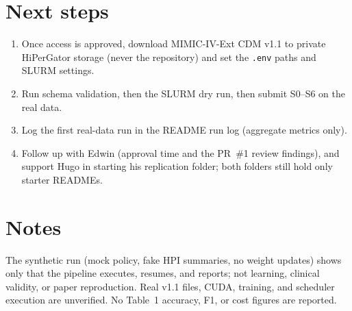 \documentclass[11pt,letterpaper]{article}
\begin{document}
\section{Next steps}
\begin{enumerate}
  \item Once access is approved, download MIMIC-IV-Ext CDM v1.1 to private HiPerGator storage (never the repository) and set the \texttt{.env} paths and SLURM settings.
  \item Run schema validation, then the SLURM dry run, then submit S0--S6 on the real data.
  \item Log the first real-data run in the README run log (aggregate metrics only).
  \item Follow up with Edwin (approval time and the PR~\#1 review findings), and support Hugo in starting his replication folder; both folders still hold only starter READMEs.
\end{enumerate}

\section*{Notes}
The synthetic run (mock policy, fake HPI summaries, no weight updates) shows only that the pipeline executes, resumes, and reports; not learning, clinical validity, or paper reproduction. Real v1.1 files, CUDA, training, and scheduler execution are unverified. No Table~1 accuracy, F1, or cost figures are reported.
\end{document}
